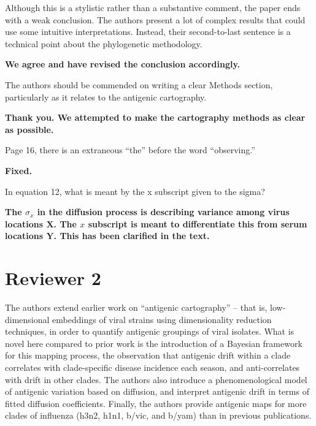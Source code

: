 \documentclass[11pt,oneside,letterpaper]{article}
\begin{document}
Although this is a stylistic rather than a substantive comment, the paper ends with a weak conclusion. The authors present a lot of complex results that could use some intuitive interpretations. Instead, their second-to-last sentence is a technical point about the phylogenetic methodology.

\textbf{We agree and have revised the conclusion accordingly.}

The authors should be commended on writing a clear Methods section, particularly as it relates to the antigenic cartography.

\textbf{Thank you. We attempted to make the cartography methods as clear as possible.}

Page 16, there is an extraneous ``the'' before the word ``observing.''

\textbf{Fixed.}

In equation 12, what is meant by the x subscript given to the sigma?

\textbf{The $\sigma_x$ in the diffusion process is describing variance among virus locations $\mathbf{X}$.  The $x$ subscript is meant to differentiate this from serum locations $\mathbf{Y}$.  This has been clarified in the text.}

\section*{Reviewer 2}

The authors extend earlier work on ``antigenic cartography'' -- that is, low-dimensional embeddings of viral strains using dimensionality reduction techniques, in order to quantify antigenic groupings of viral isolates. What is novel here compared to prior work is the introduction of a Bayesian framework for this mapping process, the observation that antigenic drift within a clade correlates with clade-specific disease incidence each season, and anti-correlates with drift in other clades. The authors also introduce a phenomenological model of antigenic variation based on diffusion, and interpret antigenic drift in terms of fitted diffusion coefficients. Finally, the authors provide antigenic maps for more clades of influenza (h3n2, h1n1, b/vic, and b/yam) than in previous publications.
\end{document}
